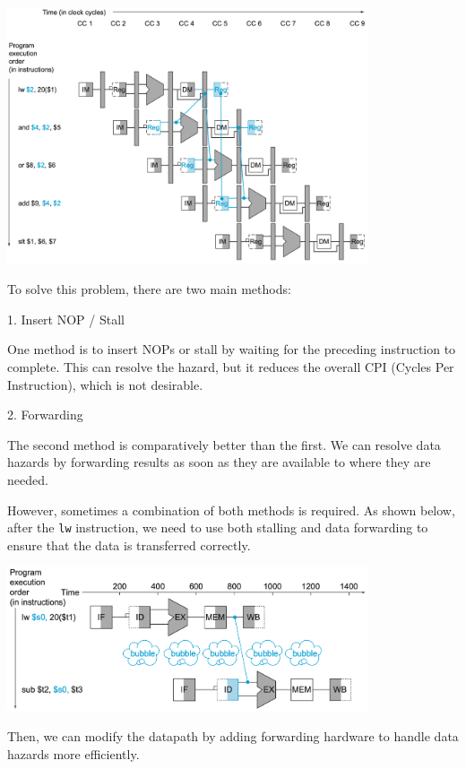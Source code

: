 \begin{center}
  \includegraphics[width=0.8\textwidth]{Figure/pipeline_load_use.png}
\end{center}

To solve this problem, there are two main methods:

1. Insert NOP / Stall

One method is to insert NOPs or stall by waiting for the preceding instruction to complete. This can resolve the hazard, but it reduces the overall CPI (Cycles Per Instruction), which is not desirable.

2. Forwarding

The second method is comparatively better than the first. We can resolve data hazards by forwarding results as soon as they are available to where they are needed.

However, sometimes a combination of both methods is required. As shown below, after the \verb|lw| instruction, we need to use both stalling and data forwarding to ensure that the data is transferred correctly.

\begin{center}
  \includegraphics[width=0.8\textwidth]{Figure/pipeline_stall_forw.png}
\end{center}

Then, we can modify the datapath by adding forwarding hardware to handle data hazards more efficiently.

